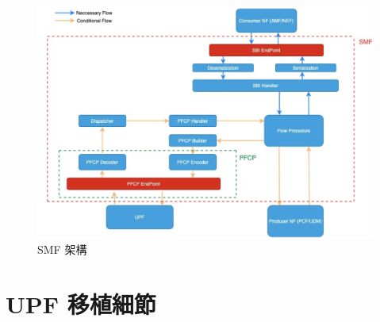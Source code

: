 \begin{figure}[htbp]
  \centering
  \includegraphics[height=!,width=1\linewidth,keepaspectratio=true]
                  {figures/smf_arch}
  \caption[SMF 架構]{{\footnotesize SMF 架構}}
  \label{fig:smf_arch}
\end{figure}

\section{UPF 移植細節}
\label{sec:upf_porting}
